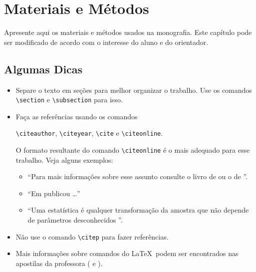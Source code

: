 \documentclass[12pt,a4paper,header]{abnt}
\begin{document}
\chapter{Materiais e Métodos}

Apresente aqui os materiais e métodos usados na monografia. Este capítulo pode ser modificado de acordo com o interesse do aluno e do orientador. 

\section{Algumas Dicas}

\begin{itemize}

\item 
Separe o texto em seções para melhor organizar o trabalho. Use os comandos \verb|\section| e \verb|\subsection| para isso. 

\item 
Faça as referências usando os comandos 
\begin{center}
\verb|\citeauthor|, \verb|\citeyear|, \verb|\cite| e \verb|\citeonline|.
\end{center} O formato resultante do comando \verb|\citeonline| é o mais adequado para esse trabalho. Veja alguns exemplos:
\begin{itemize}

\item ``Para mais informações sobre esse assunto consulte o livro de  ou o de ''.

\item ``Em \citeyear{james} \citeauthor{james} publicou \ldots''

\item ``Uma estatística é qualquer transformação da amostra que não depende de parâmetros desconhecidos \cite{casella}''.

\end{itemize} 

\item Não use o comando \verb|\citep| para fazer referências. 

\item Mais informações sobre comandos do \LaTeX\ podem ser encontrados nas apostilas da professora \citeauthor{jessica_latex_basico} (\citeyear{jessica_latex_basico} e \citeyear{jessica_latex_intermediario}).

\end{itemize}
\end{document}
